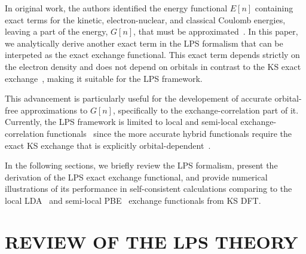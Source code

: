 \documentclass[%
 reprint,
 amsmath,amssymb,
 aps,
pra,
]{revtex4-2}
\begin{document}
In original work, the authors identified the energy functional $E[n]$ containing exact terms for the kinetic, electron-nuclear, and classical Coulomb energies, leaving a part of the energy, $G[n]$, that must be approximated~\cite{Levy.1984.PRA.30.2745}. In this paper, we analytically derive another exact term in the LPS formalism that can be interpeted as the exact exchange functional. This exact term depends strictly on the electron density and does not depend on orbitals in contrast to the KS exact exchange~\cite{Parr.1989.density}, making it suitable for the LPS framework. 

This advancement is particularly useful for the developement of accurate orbital-free approximations to $G[n]$, specifically to the exchange-correlation part of it. Currently, the LPS framework is limited to local and semi-local exchange-correlation functionals~\cite{Perdew.2001.ACP.577.1, Staroverov.2012.Matter} since the more accurate hybrid functionals require the exact KS exchange that is explicitly orbital-dependent~\cite{Parr.1989.density}. 

In the following sections, we briefly review the LPS formalism, present the derivation of the LPS exact exchange functional, and provide numerical illustrations of its performance in self-consistent calculations comparing to the local LDA~\cite{Dirac.1930.MPCPS.26.376} and semi-local PBE~\cite{Perdew.1996.PRL.77.3865, Perdew.1997.PRL.78.1396} exchange functionals from KS DFT. 

\section{REVIEW OF THE LPS THEORY}
\end{document}
